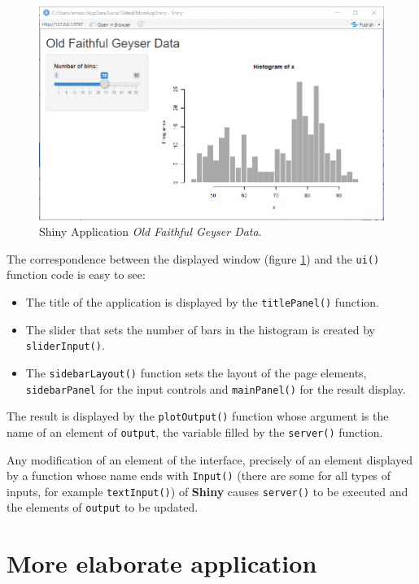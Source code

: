\documentclass[
  12pt,
  american,
  a4paper,
  extrafontsizes,onecolumn,openright
  ]{memoir}
\providecommand{\tightlist}{%
  \setlength{\itemsep}{0pt}\setlength{\parskip}{0pt}}
\newlength{\rf}
\begin{document}
\begin{figure}

{\centering \includegraphics[width=0.8\linewidth]{images/shiny-geiser} 

}

\caption{Shiny Application \emph{Old Faithful Geyser Data}.}\label{fig:shiny-geiser}
\end{figure}

\normalsize

The correspondence between the displayed window (figure \ref{fig:shiny-geiser}) and the \texttt{ui()} function code is easy to see:

\begin{itemize}
\tightlist
\item
  The title of the application is displayed by the \texttt{titlePanel()} function.
\item
  The slider that sets the number of bars in the histogram is created by \texttt{sliderInput()}.
\item
  The \texttt{sidebarLayout()} function sets the layout of the page elements, \texttt{sidebarPanel} for the input controls and \texttt{mainPanel()} for the result display.
\end{itemize}

The result is displayed by the \texttt{plotOutput()} function whose argument is the name of an element of \texttt{output}, the variable filled by the \texttt{server()} function.

Any modification of an element of the interface, precisely of an element displayed by a function whose name ends with \texttt{Input()} (there are some for all types of inputs, for example \texttt{textInput()}) of \textbf{Shiny} causes \texttt{server()} to be executed and the elements of \texttt{output} to be updated.

\hypertarget{more-elaborate-application}{%
\section{More elaborate application}\label{more-elaborate-application}}
\end{document}
